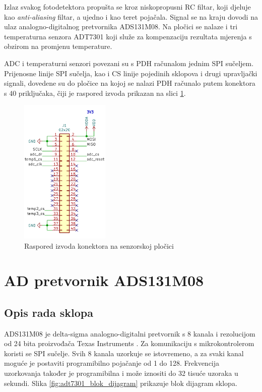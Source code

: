 Izlaz svakog fotodetektora propušta se kroz niskopropusni RC filtar, koji djeluje kao \textit{anti-aliasing} filtar, a ujedno i kao teret pojačala. Signal se na kraju dovodi na ulaz analogno-digitalnog pretvornika ADS131M08. Na pločici se nalaze i tri temperaturna senzora ADT7301 koji služe za kompenzaciju rezultata mjerenja s obzirom na promjenu temperature.

ADC i temperaturni senzori povezani su s PDH računalom jednim SPI sučeljem. Prijenosne linije SPI sučelja, kao i CS linije pojedinih sklopova i drugi upravljački signali, dovedene su do pločice na kojoj se nalazi PDH računalo putem konektora s 40 priključaka, čiji je raspored izvoda prikazan na slici \ref{fig:konektor}.

\begin{figure}[h!]
    \centering
    \includegraphics[height=7cm]{slike/konektor.png}
    \caption{Raspored izvoda konektora na senzorskoj pločici}
    \label{fig:konektor}
\end{figure}

\section{AD pretvornik ADS131M08} \label{section_adc}

\subsection{Opis rada sklopa}
ADS131M08 je delta-sigma analogno-digitalni pretvornik s 8 kanala i rezolucijom od 24 bita proizvođača Texas Instruments \cite{ads131m08_datasheet}. Za komunikaciju s mikrokontrolerom koristi se SPI sučelje. Svih 8 kanala uzorkuje se istovremeno, a za svaki kanal moguće je postaviti programibilno pojačanje od 1 do 128. Frekvencija uzorkovanja također je programibilna i može iznositi do 32 tisuće uzoraka u sekundi. Slika \ref{fig:adt7301_blok_dijagram} prikazuje blok dijagram sklopa.

